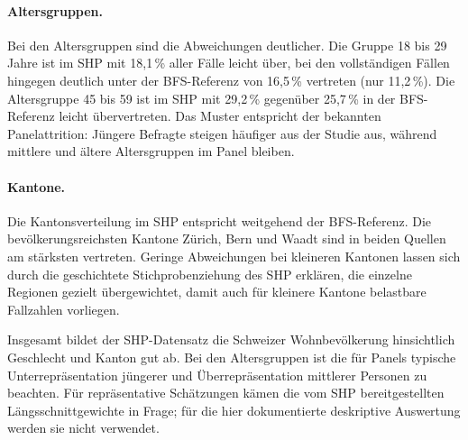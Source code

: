 \paragraph{Altersgruppen.}
Bei den Altersgruppen sind die Abweichungen deutlicher. Die Gruppe 18 bis 29 Jahre ist
im SHP mit 18{,}1\,\% aller Fälle leicht über, bei den vollständigen Fällen hingegen
deutlich unter der BFS-Referenz von 16{,}5\,\% vertreten (nur 11{,}2\,\%). Die
Altersgruppe 45 bis 59 ist im SHP mit 29{,}2\,\% gegenüber 25{,}7\,\% in der
BFS-Referenz leicht übervertreten. Das Muster entspricht der bekannten
Panelattrition: Jüngere Befragte steigen häufiger aus der Studie aus, während mittlere
und ältere Altersgruppen im Panel bleiben.

\paragraph{Kantone.}
Die Kantonsverteilung im SHP entspricht weitgehend der BFS-Referenz. Die
bevölkerungsreichsten Kantone Zürich, Bern und Waadt sind in beiden Quellen am
stärksten vertreten. Geringe Abweichungen bei kleineren Kantonen lassen sich durch die
geschichtete Stichprobenziehung des SHP erklären, die einzelne Regionen gezielt
übergewichtet, damit auch für kleinere Kantone belastbare Fallzahlen vorliegen.

Insgesamt bildet der SHP-Datensatz die Schweizer Wohnbevölkerung hinsichtlich
Geschlecht und Kanton gut ab. Bei den Altersgruppen ist die für Panels typische
Unterrepräsentation jüngerer und Überrepräsentation mittlerer Personen zu beachten.
Für repräsentative Schätzungen kämen die vom SHP bereitgestellten
Längsschnittgewichte in Frage; für die hier dokumentierte deskriptive Auswertung
werden sie nicht verwendet.
